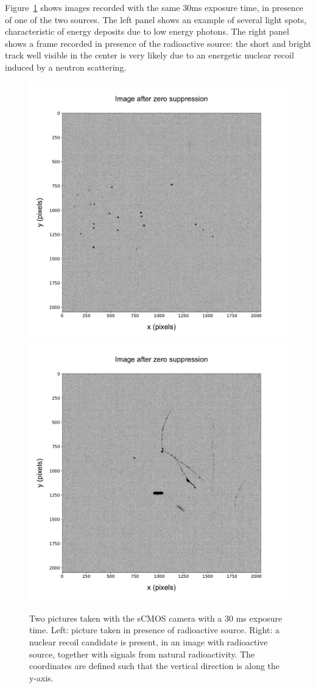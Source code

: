 \documentclass[12pt]{iopart}
\begin{document}
\vspace{10pt}

Figure~\ref{fig:signals} shows images recorded with the same
30\unit{ms} exposure time, in presence of one of the two sources. The
left panel shows an example of several light spots, characteristic of
energy deposits due to \fe low energy photons.  The right panel shows
a frame recorded in presence of the \ambe radioactive source: the
short and bright track well visible in the center is very likely due
to an energetic nuclear recoil induced by a neutron scattering.
% 
\begin{figure}[ht]
  \begin{center}
    \includegraphics[width=0.49\linewidth]{figures/pic_run01843_ev93_oriIma_paper}
    \includegraphics[width=0.49\linewidth]{figures/pic_run02317_ev342_oriIma_paper}
    \caption{Two pictures taken with the sCMOS camera with a 30 ms
      exposure time. Left: picture taken in presence of \fe
      radioactive source. Right: a nuclear recoil candidate is
      present, in an image with \ambe radioactive source, together
      with signals from natural radioactivity.  The coordinates are
      defined such that the vertical direction is along the
      y-axis.  \label{fig:signals}}
  \end{center}
\end{figure}
\end{document}
